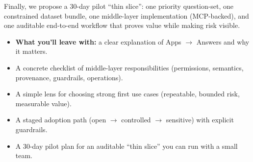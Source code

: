 Finally, we propose a 30-day pilot ``thin slice'': one priority question-set, one constrained dataset bundle, one middle-layer implementation (MCP-backed), and one auditable end-to-end workflow that proves value while making risk visible.

\begin{itemize}[leftmargin=*]
  \item \textbf{What you’ll leave with:} a clear explanation of Apps $\rightarrow$ Answers and why it matters.
  \item A concrete checklist of middle-layer responsibilities (permissions, semantics, provenance, guardrails, operations).
  \item A simple lens for choosing strong first use cases (repeatable, bounded risk, measurable value).
  \item A staged adoption path (open $\rightarrow$ controlled $\rightarrow$ sensitive) with explicit guardrails.
  \item A 30-day pilot plan for an auditable ``thin slice'' you can run with a small team.
\end{itemize}
